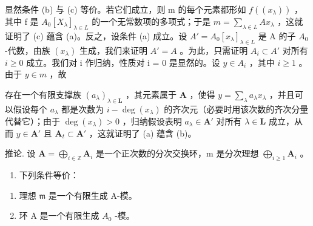 显然条件 (b) 与 (c) 等价。若它们成立，则 m 的每个元素都形如 \(f((x_{\lambda}))\) ，其中 f 是 \(A_{0}[X_{\lambda}]_{\lambda \in L}\) 的一个无常数项的多项式；于是 \(m = \sum_{\lambda \in L} Ax_{\lambda}\) ，这就证明了 (c) 蕴含 (a)。反之，设条件 (a) 成立。设 \(A' = A_{0}[x_{\lambda}]_{\lambda \in L}\) 是 A 的子 \(A_{0}\) -代数，由族 \((x_{\lambda})\) 生成，我们来证明 \(A' = A\) 。为此，只需证明 \(A_{i} \subset A'\) 对所有 \(i \geqslant 0\) 成立。我们对 i 作归纳，性质对 i = 0 是显然的。设 \(y \in A_{i}\) ，其中 \(i \geqslant 1\) 。由于 \(y \in m\) ，故

存在一个有限支撑族 \((a_{\lambda})_{\lambda \in \mathbf{L}}\) ，其元素属于 \(\mathbf{A}\) ，使得 \(y = \sum_{\lambda} a_{\lambda} x_{\lambda}\) ，并且可以假设每个 \(a_{\lambda}\) 都是次数为 \(i - \deg(x_{\lambda})\) 的齐次元（必要时用该次数的齐次分量代替它）；由于 \(\deg(x_{\lambda}) > 0\) ，归纳假设表明 \(a_{\lambda} \in \mathbf{A}'\) 对所有 \(\lambda \in \mathbf{L}\) 成立，从而 \(y \in \mathbf{A}'\) 且 \(\mathbf{A}_t \subset \mathbf{A}'\) ，这就证明了 (a) 蕴含 (b)。

推论. 设 \(\mathbf{A} = \bigoplus_{i\in \mathbb{Z}}\mathbf{A}_i\) 是一个正次数的分次交换环，m 是分次理想 \(\bigoplus_{i\geqslant 1}\mathbf{A}_i\) 。

\begin{enumerate}
\def\labelenumi{(\roman{enumi})}
\tightlist
\item
  下列条件等价：
\end{enumerate}

\begin{enumerate}
\def\labelenumi{(\alph{enumi})}
\item
  理想 \(\mathfrak{m}\) 是一个有限生成 A-模。
\item
  环 A 是一个有限生成 \(A_{0}\) -模。
\end{enumerate}

